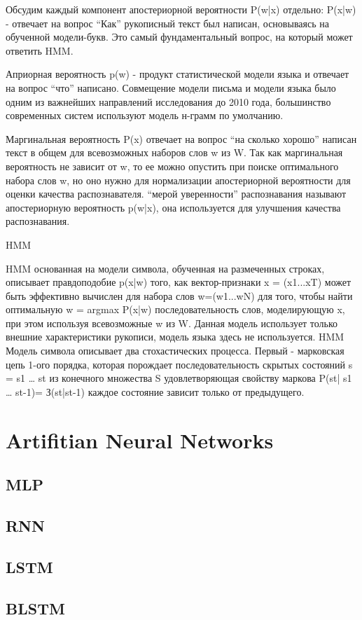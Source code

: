 Обсудим каждый компонент апостериорной вероятности P(w|x) отдельно:
P(x|w) - отвечает на вопрос “Как” рукописный текст был написан, основываясь на обученной модели-букв. Это самый фундаментальный вопрос, на который может ответить HMM.

Априорная вероятность p(w) - продукт статистической модели языка и отвечает на вопрос “что” написано. Совмещение модели письма и модели языка было одним из важнейших направлений исследования до 2010 года, большинство современных систем используют модель н-грамм по умолчанию.

Маргинальная вероятность P(x) отвечает на вопрос “на сколько хорошо” написан текст в общем для всевозможных наборов слов w из W. Так как маргинальная вероятность не зависит от w, то ее можно опустить при поиске оптимального набора слов w, но оно нужно для нормализации апостериорной вероятности для оценки качества распознавателя. “мерой уверенности” распознавания называют апостериорную вероятность p(w|x), она используется для улучшения качества распознавания.

HMM

HMM основанная на модели символа, обученная на размеченных строках, описывает правдоподобие p(x|w) того, как вектор-признаки x = (x1...xT) может быть эффективно вычислен для набора слов w=(w1...wN) для того, чтобы найти оптимальную w = argmax P(x|w) последовательность слов, моделирующую x, при этом используя всевозможные w из W. Данная модель использует только внешние характеристики рукописи, модель языка здесь не используется.
HMM Модель символа описывает два стохастических процесса.  Первый - марковская цепь 1-ого порядка, которая порождает последовательность скрытых состояний s = s1 … st из конечного множества S  удовлетворяющая свойству маркова P(st| s1 … st-1)= З(st|st-1) каждое состояние зависит только от предыдущего.



\section{Artifitian Neural Networks} \label{sect3_4}

\subsection{MLP} \label{sect3_4}

\subsection{RNN} \label{sect3_4}

\subsection{LSTM} \label{sect3_4_1}

\subsection{BLSTM} \label{sect3_4_2}
